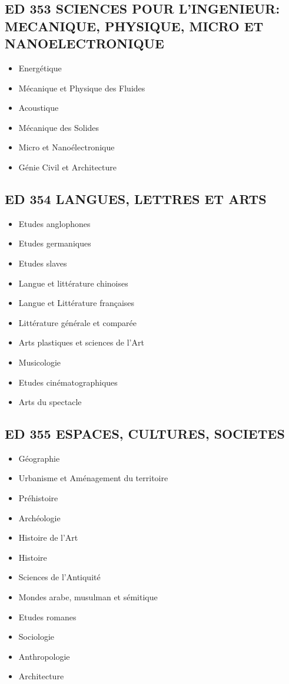 \subsection*{ED 353 SCIENCES POUR L'INGENIEUR: MECANIQUE, PHYSIQUE, MICRO ET NANOELECTRONIQUE}\label{ed-353-sciences-pour-lingenieur-mecanique-physique-micro-et-nanoelectronique}

\begin{itemize}
\item Energétique
\item Mécanique et Physique des Fluides
\item Acoustique
\item Mécanique des Solides
\item Micro et Nanoélectronique
\item Génie Civil et Architecture
\end{itemize}

\subsection*{ED 354 LANGUES, LETTRES ET ARTS}\label{ed-354-langues-lettres-et-arts}

\begin{itemize}
\item Etudes anglophones
\item Etudes germaniques
\item Etudes slaves
\item Langue et littérature chinoises
\item Langue et Littérature françaises
\item Littérature générale et comparée
\item Arts plastiques et sciences de l'Art
\item Musicologie
\item Etudes cinématographiques
\item Arts du spectacle
\end{itemize}

\subsection*{ED 355 ESPACES, CULTURES, SOCIETES}\label{ed-355-espaces-cultures-societes}

\begin{itemize}
\item Géographie
\item Urbanisme et Aménagement du territoire
\item Préhistoire
\item Archéologie
\item Histoire de l'Art
\item Histoire
\item Sciences de l'Antiquité
\item Mondes arabe, musulman et sémitique
\item Etudes romanes
\item Sociologie
\item Anthropologie
\item Architecture
\end{itemize}

